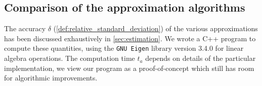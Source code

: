 \documentclass[11pt]{scrartcl}
\numberwithin{equation}{section}
\begin{document}
\subsection{Comparison of the  approximation algorithms}\label{sec:performance}

The accuracy $\delta$ (\cref{def:relative_standard_deviation}) of the various approximations has been discussed exhaustively in \cref{sec:estimation}. We wrote a C++ program to compute these quantities, using the \texttt{GNU Eigen} library version 3.4.0 for linear algebra operations. The computation time $t_a$ depends on  details of the particular implementation, we view our program as a proof-of-concept which still has room for algorithmic improvements. 
\end{document}
